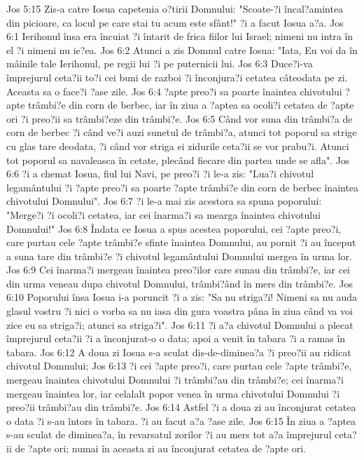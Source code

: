 Jos 5:15  Zis-a catre Iosua capetenia o?tirii Domnului: "Scoate-?i încal?amintea din picioare, ca locul pe care stai tu acum este sfânt!" ?i a facut Iosua a?a.
Jos 6:1  Ierihonul însa era încuiat ?i întarit de frica fiilor lui Israel; nimeni nu intra în el ?i nimeni nu ie?ea.
Jos 6:2  Atunci a zis Domnul catre Iosua: "Iata, Eu voi da în mâinile tale Ierihonul, pe regii lui ?i pe puternicii lui.
Jos 6:3  Duce?i-va împrejurul ceta?ii to?i cei buni de razboi ?i înconjura?i cetatea câteodata pe zi. Aceasta sa o face?i ?ase zile.
Jos 6:4  ?apte preo?i sa poarte înaintea chivotului ?apte trâmbi?e din corn de berbec, iar în ziua a ?aptea sa ocoli?i cetatea de ?apte ori ?i preo?ii sa trâmbi?eze din trâmbi?e.
Jos 6:5  Când vor suna din trâmbi?a de corn de berbec ?i când ve?i auzi sunetul de trâmbi?a, atunci tot poporul sa strige cu glas tare deodata, ?i când vor striga ei zidurile ceta?ii se vor prabu?i. Atunci tot poporul sa navaleasca în cetate, plecând fiecare din partea unde se afla".
Jos 6:6  ?i a chemat Iosua, fiul lui Navi, pe preo?i ?i le-a zis: "Lua?i chivotul legamântului ?i ?apte preo?i sa poarte ?apte trâmbi?e din corn de berbec înaintea chivotului Domnului".
Jos 6:7  ?i le-a mai zis acestora sa spuna poporului: "Merge?i ?i ocoli?i cetatea, iar cei înarma?i sa mearga înaintea chivotului Domnului!"
Jos 6:8  Îndata ce Iosua a spus acestea poporului, cei ?apte preo?i, care purtau cele ?apte trâmbi?e sfinte înaintea Domnului, au pornit ?i au început a suna tare din trâmbi?e ?i chivotul legamântului Domnului mergea în urma lor.
Jos 6:9  Cei înarma?i mergeau înaintea preo?ilor care sunau din trâmbi?e, iar cei din urma veneau dupa chivotul Domnului, trâmbi?ând în mers din trâmbi?e.
Jos 6:10  Poporului însa Iosua i-a poruncit ?i a zis: "Sa nu striga?i! Nimeni sa nu auda glasul vostru ?i nici o vorba sa nu iasa din gura voastra pâna în ziua când va voi zice eu sa striga?i; atunci sa striga?i".
Jos 6:11  ?i a?a chivotul Domnului a plecat împrejurul ceta?ii ?i a înconjurat-o o data; apoi a venit în tabara ?i a ramas în tabara.
Jos 6:12  A doua zi Iosua s-a sculat dis-de-diminea?a ?i preo?ii au ridicat chivotul Domnului;
Jos 6:13  ?i cei ?apte preo?i, care purtau cele ?apte trâmbi?e, mergeau înaintea chivotului Domnului ?i trâmbi?au din trâmbi?e; cei înarma?i mergeau înaintea lor, iar celalalt popor venea în urma chivotului Domnului ?i preo?ii trâmbi?au din trâmbi?e.
Jos 6:14  Astfel ?i a doua zi au înconjurat cetatea o data ?i s-au întors în tabara. ?i au facut a?a ?ase zile.
Jos 6:15  În ziua a ?aptea s-au sculat de diminea?a, în revarsatul zorilor ?i au mers tot a?a împrejurul ceta?ii de ?apte ori; numai în aceasta zi au înconjurat cetatea de ?apte ori.
